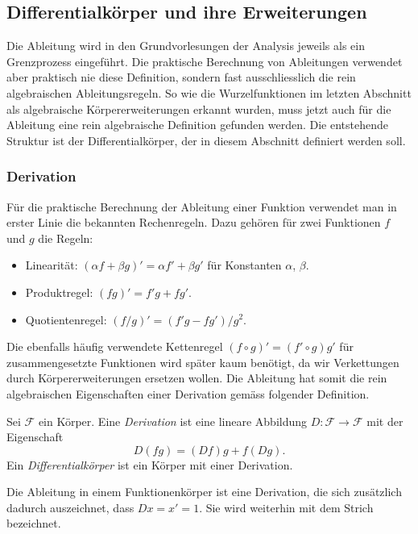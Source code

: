%
%
%
\subsection{Differentialkörper und ihre Erweiterungen
\label{buch:integral:subsection:diffke}}
Die Ableitung wird in den Grundvorlesungen der Analysis jeweils
als ein Grenzprozess eingeführt.
Die praktische Berechnung von Ableitungen verwendet aber praktisch
nie diese Definition, sondern fast ausschliesslich die rein algebraischen
Ableitungsregeln.
So wie die Wurzelfunktionen im letzten Abschnitt als algebraische
Körpererweiterungen erkannt wurden, muss jetzt auch für die Ableitung
eine rein algebraische Definition gefunden werden.
Die entstehende Struktur ist der Differentialkörper, der in diesem
Abschnitt definiert werden soll.

%
%
\subsubsection{Derivation}
Für die praktische Berechnung der Ableitung einer Funktion verwendet
man in erster Linie die bekannten Rechenregeln.
Dazu gehören für zwei Funktionen $f$ und $g$ die Regeln:
\begin{itemize}
\item Linearität: $(\alpha f+\beta g)' = \alpha f' + \beta g'$ für
Konstanten $\alpha$, $\beta$.
\item Produktregel: $(fg)'=f'g+fg'$.
%
\item Quotientenregel: $(f/g)' = (f'g-fg')/g^2$.
%
\end{itemize}
Die ebenfalls häufig verwendete Kettenregel $(f\circ g)' = (f'\circ g) g'$
%
für zusammengesetzte Funktionen wird später kaum benötigt, da wir
Verkettungen durch Körpererweiterungen ersetzen wollen.
Die Ableitung hat somit die rein algebraischen Eigenschaften
einer Derivation gemäss folgender Definition.

\begin{definition}
Sei $\mathscr{F}$ ein Körper.
Eine {\em Derivation} ist eine lineare Abbildung
%
$D\colon \mathscr{F}\to\mathscr{F}$
mit der Eigenschaft
\[
D(fg) = (Df)g+f(Dg).
\]
Ein {\em Differentialkörper} ist ein Körper mit einer Derivation.
%
\end{definition}

Die Ableitung in einem Funktionenkörper ist eine Derivation,
die sich zusätzlich dadurch auszeichnet, dass $Dx=x'=1$.
Sie wird weiterhin mit dem Strich bezeichnet.

